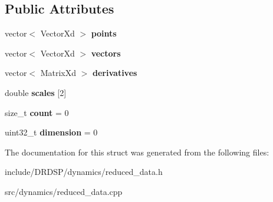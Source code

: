 \subsection*{Public Attributes}
\begin{DoxyCompactItemize}
\item 
\hypertarget{struct_d_r_d_s_p_1_1_reduced_data_abd8c77d4f236d3d070877ce0fba784ea}{vector$<$ Vector\-Xd $>$ {\bfseries points}}\label{struct_d_r_d_s_p_1_1_reduced_data_abd8c77d4f236d3d070877ce0fba784ea}

\item 
\hypertarget{struct_d_r_d_s_p_1_1_reduced_data_a73865908c2b66ef58976c979ffc7362d}{vector$<$ Vector\-Xd $>$ {\bfseries vectors}}\label{struct_d_r_d_s_p_1_1_reduced_data_a73865908c2b66ef58976c979ffc7362d}

\item 
\hypertarget{struct_d_r_d_s_p_1_1_reduced_data_aefd68b7db76c0b15c848c7a9d2801fbd}{vector$<$ Matrix\-Xd $>$ {\bfseries derivatives}}\label{struct_d_r_d_s_p_1_1_reduced_data_aefd68b7db76c0b15c848c7a9d2801fbd}

\item 
\hypertarget{struct_d_r_d_s_p_1_1_reduced_data_ab96e3e52f0f3645ed735c01739b565bb}{double {\bfseries scales} \mbox{[}2\mbox{]}}\label{struct_d_r_d_s_p_1_1_reduced_data_ab96e3e52f0f3645ed735c01739b565bb}

\item 
\hypertarget{struct_d_r_d_s_p_1_1_reduced_data_af37223a7bdac263102f238a5f61df873}{size\-\_\-t {\bfseries count} = 0}\label{struct_d_r_d_s_p_1_1_reduced_data_af37223a7bdac263102f238a5f61df873}

\item 
\hypertarget{struct_d_r_d_s_p_1_1_reduced_data_ab1afd073659db487a0480121e8f64199}{uint32\-\_\-t {\bfseries dimension} = 0}\label{struct_d_r_d_s_p_1_1_reduced_data_ab1afd073659db487a0480121e8f64199}

\end{DoxyCompactItemize}


The documentation for this struct was generated from the following files\-:\begin{DoxyCompactItemize}
\item 
include/\-D\-R\-D\-S\-P/dynamics/reduced\-\_\-data.\-h\item 
src/dynamics/reduced\-\_\-data.\-cpp\end{DoxyCompactItemize}

